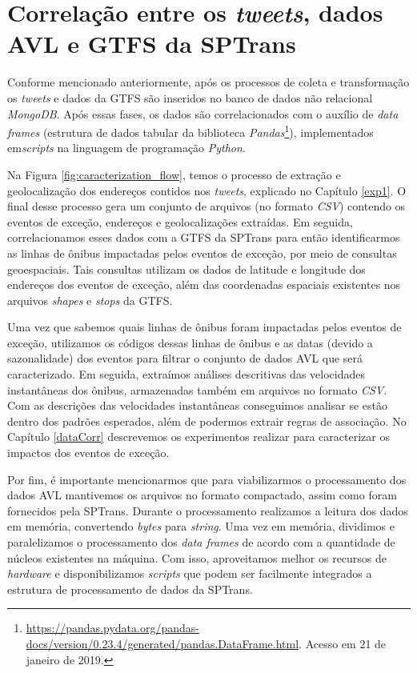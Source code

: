 \documentclass[
	12pt,				%
	oneside,			%
	a4paper,			%
	english,			%
	brazil				%
	]{abntex2ppgsi}
\begin{document}
{{\section{Correlação entre os \textit{tweets}, dados AVL e GTFS da SPTrans}
\label{corrAll}

Conforme mencionado anteriormente, após os processos de coleta e transformação os \textit{tweets} e dados da GTFS são inseridos no banco de dados não relacional \textit{MongoDB}. Após essas fases, os dados são correlacionados com o auxílio de \textit{data frames} (estrutura de dados tabular da biblioteca \textit{Pandas}\footnote{\url{https://pandas.pydata.org/pandas-docs/version/0.23.4/generated/pandas.DataFrame.html}. Acesso em 21 de janeiro de 2019.}), implementados em\textit{scripts} na linguagem de programação \textit{Python}.

Na Figura \ref{fig:caracterization_flow}, temos o processo de extração e geolocalização dos endereços contidos nos \textit{tweets}, explicado no Capítulo \ref{exp1}. O final desse processo gera um conjunto de arquivos (no formato \textit{CSV}) contendo os eventos de exceção, endereços e geolocalizações extraídas.  Em seguida, correlacionamos esses dados com a GTFS da SPTrans para então identificarmos as linhas de ônibus impactadas pelos eventos de exceção, por meio de consultas geoespaciais. Tais consultas utilizam os dados de latitude e longitude dos endereços dos eventos de exceção, além das coordenadas espaciais existentes nos arquivos \textit{shapes} e \textit{stops} da GTFS.

Uma vez que sabemos quais linhas de ônibus foram impactadas pelos eventos de exceção, utilizamos os códigos dessas linhas de ônibus e as datas (devido a sazonalidade) dos eventos para filtrar o conjunto de dados AVL que será caracterizado. Em seguida, extraímos análises descritivas das velocidades instantâneas dos ônibus, armazenadas também em arquivos no formato \textit{CSV}. Com as descrições das velocidades instantâneas conseguimos analisar se estão dentro dos padrões esperados, além de podermos extrair regras de associação. No Capítulo \ref{dataCorr} descrevemos os experimentos realizar para caracterizar os impactos dos eventos de exceção.

Por fim, é importante mencionarmos que para viabilizarmos o processamento dos dados AVL mantivemos os arquivos no formato compactado, assim como foram fornecidos pela SPTrans. Durante o processamento realizamos a leitura dos dados em memória, convertendo \textit{bytes} para \textit{string}. Uma vez em memória, dividimos e paralelizamos o processamento dos \textit{data frames} de acordo com a quantidade de núcleos existentes na máquina. Com isso, aproveitamos melhor os recursos de \textit{hardware} e disponibilizamos \textit{scripts} que podem ser facilmente integrados a estrutura de processamento de dados da SPTrans.

}}
\end{document}
